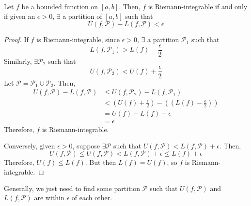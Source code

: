 \begin{theorem}
    Let $f$ be a bounded function on $[a, b]$. Then, $f$ is Riemann-integrable if and only if given an $\epsilon > 0$, $\exists$ a partition of $[a, b]$ such that $$U(f, \mathcal{P}) - L(f, \mathcal{P}) < \epsilon$$
\end{theorem}
\begin{proof}
    If $f$ is Riemann-integrable, since $\epsilon > 0$, $\exists$ a partition $\mathcal{P}_1$ such that $$L(f, \mathcal{P}_1) > L(f) - \frac{\epsilon}{2}$$
    Similarly, $\exists \mathcal{P}_2$ such that $$U(f, \mathcal{P}_2) < U(f) + \frac{\epsilon}{2}$$
    Let $\mathcal{P} = \mathcal{P}_1 \cup \mathcal{P}_2$. Then,
    \begin{align*}
        U(f, \mathcal{P}) - L(f, \mathcal{P}) &\leq U(f, \mathcal{P}_2) - L(f, \mathcal{P}_1) \\
        &< \left(U(f) + \frac{\epsilon}{2}\right) - \left((L(f) - \frac{\epsilon}{2})\right) \\
        &= U(f) - L(f) + \epsilon \\
        &= \epsilon
    \end{align*}
    Therefore, $f$ is Riemann-integrable.

    Conversely, given $\epsilon > 0$, suppose $\exists \mathcal{P}$ such that $U(f, \mathcal{P}) < L(f, \mathcal{P}) + \epsilon$. Then, $$U(f, \mathcal{P}) \leq U(f, \mathcal{P}) < L(f, \mathcal{P}) + \epsilon \leq L(f) + \epsilon$$
    Therefore, $U(f) \leq L(f)$. But then $L(f) = U(f)$, so $f$ is Riemann-integrable.
\end{proof}
\begin{remark}
    Generally, we just need to find some partition $\mathcal{P}$ such that $U(f, \mathcal{P})$ and $L(f, \mathcal{P})$ are within $\epsilon$ of each other.
\end{remark}
